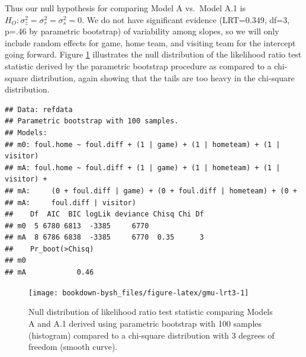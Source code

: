\documentclass[
]{krantz}
\begin{document}
Thus our null hypothesis for comparing Model A vs.~Model A.1 is \(H_{O}: \sigma_{z}^{2}=\sigma_{r}^{2}=\sigma_{s}^{2}=0\). We do not have significant evidence (LRT=0.349, df=3, p=.46 by parametric bootstrap) of variability among slopes, so we will only include random effects for game, home team, and visiting team for the intercept going forward. Figure \ref{fig:gmu-lrt3} illustrates the null distribution of the likelihood ratio test statistic derived by the parametric bootstrap procedure as compared to a chi-square distribution, again showing that the tails are too heavy in the chi-square distribution.

\begin{verbatim}
## Data: refdata
## Parametric bootstrap with 100 samples.
## Models:
## m0: foul.home ~ foul.diff + (1 | game) + (1 | hometeam) + (1 | visitor)
## mA: foul.home ~ foul.diff + (1 | game) + (1 | hometeam) + (1 | visitor) + 
## mA:     (0 + foul.diff | game) + (0 + foul.diff | hometeam) + (0 + 
## mA:     foul.diff | visitor)
##    Df  AIC  BIC logLik deviance Chisq Chi Df
## m0  5 6780 6813  -3385     6770             
## mA  8 6786 6838  -3385     6770  0.35      3
##    Pr_boot(>Chisq)
## m0                
## mA            0.46
\end{verbatim}

\begin{figure}

{\centering \texttt{[image: bookdown-bysh\_files/figure-latex/gmu-lrt3-1]} 

}

\caption{Null distribution of likelihood ratio test statistic comparing Models A and A.1 derived using parametric bootstrap with 100 samples (histogram) compared to a chi-square distribution with 3 degrees of freedom (smooth curve).}\label{fig:gmu-lrt3}
\end{figure}
\end{document}
